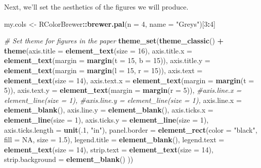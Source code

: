 \documentclass[]{article}
\newenvironment{Shaded}{\begin{snugshade}}{\end{snugshade}}
\newcommand{\KeywordTok}[1]{\textcolor[rgb]{0.13,0.29,0.53}{\textbf{#1}}}
\newcommand{\DataTypeTok}[1]{\textcolor[rgb]{0.13,0.29,0.53}{#1}}
\newcommand{\DecValTok}[1]{\textcolor[rgb]{0.00,0.00,0.81}{#1}}
\newcommand{\FloatTok}[1]{\textcolor[rgb]{0.00,0.00,0.81}{#1}}
\newcommand{\StringTok}[1]{\textcolor[rgb]{0.31,0.60,0.02}{#1}}
\newcommand{\CommentTok}[1]{\textcolor[rgb]{0.56,0.35,0.01}{\textit{#1}}}
\newcommand{\OtherTok}[1]{\textcolor[rgb]{0.56,0.35,0.01}{#1}}
\newcommand{\OperatorTok}[1]{\textcolor[rgb]{0.81,0.36,0.00}{\textbf{#1}}}
\newcommand{\NormalTok}[1]{#1}
\begin{document}
Next, we'll set the aesthetics of the figures we will produce.

\begin{Shaded}
\begin{Highlighting}[]
\NormalTok{my.cols <-}\StringTok{ }\NormalTok{RColorBrewer}\OperatorTok{::}\KeywordTok{brewer.pal}\NormalTok{(}\DataTypeTok{n =} \DecValTok{4}\NormalTok{, }\DataTypeTok{name =} \StringTok{"Greys"}\NormalTok{)[}\DecValTok{3}\OperatorTok{:}\DecValTok{4}\NormalTok{]}

\CommentTok{# Set theme for figures in the paper}
\KeywordTok{theme_set}\NormalTok{(}\KeywordTok{theme_classic}\NormalTok{() }\OperatorTok{+}\StringTok{ }
\StringTok{  }\KeywordTok{theme}\NormalTok{(}\DataTypeTok{axis.title =} \KeywordTok{element_text}\NormalTok{(}\DataTypeTok{size =} \DecValTok{16}\NormalTok{),}
        \DataTypeTok{axis.title.x =} \KeywordTok{element_text}\NormalTok{(}\DataTypeTok{margin =} \KeywordTok{margin}\NormalTok{(}\DataTypeTok{t =} \DecValTok{15}\NormalTok{, }\DataTypeTok{b =} \DecValTok{15}\NormalTok{)),}
        \DataTypeTok{axis.title.y =} \KeywordTok{element_text}\NormalTok{(}\DataTypeTok{margin =} \KeywordTok{margin}\NormalTok{(}\DataTypeTok{l =} \DecValTok{15}\NormalTok{, }\DataTypeTok{r =} \DecValTok{15}\NormalTok{)),}
        \DataTypeTok{axis.text =} \KeywordTok{element_text}\NormalTok{(}\DataTypeTok{size =} \DecValTok{14}\NormalTok{),}
        \DataTypeTok{axis.text.x =} \KeywordTok{element_text}\NormalTok{(}\DataTypeTok{margin =} \KeywordTok{margin}\NormalTok{(}\DataTypeTok{t =} \DecValTok{5}\NormalTok{)),}
        \DataTypeTok{axis.text.y =} \KeywordTok{element_text}\NormalTok{(}\DataTypeTok{margin =} \KeywordTok{margin}\NormalTok{(}\DataTypeTok{r =} \DecValTok{5}\NormalTok{)),}
        \CommentTok{#axis.line.x = element_line(size = 1),}
        \CommentTok{#axis.line.y = element_line(size = 1),}
        \DataTypeTok{axis.line.x =} \KeywordTok{element_blank}\NormalTok{(),}
        \DataTypeTok{axis.line.y =} \KeywordTok{element_blank}\NormalTok{(),}
        \DataTypeTok{axis.ticks.x =} \KeywordTok{element_line}\NormalTok{(}\DataTypeTok{size =} \DecValTok{1}\NormalTok{),}
        \DataTypeTok{axis.ticks.y =} \KeywordTok{element_line}\NormalTok{(}\DataTypeTok{size =} \DecValTok{1}\NormalTok{),}
        \DataTypeTok{axis.ticks.length =} \KeywordTok{unit}\NormalTok{(.}\DecValTok{1}\NormalTok{, }\StringTok{"in"}\NormalTok{),}
        \DataTypeTok{panel.border =} \KeywordTok{element_rect}\NormalTok{(}\DataTypeTok{color =} \StringTok{"black"}\NormalTok{, }\DataTypeTok{fill =} \OtherTok{NA}\NormalTok{, }\DataTypeTok{size =} \FloatTok{1.5}\NormalTok{),}
        \DataTypeTok{legend.title =} \KeywordTok{element_blank}\NormalTok{(),}
        \DataTypeTok{legend.text =} \KeywordTok{element_text}\NormalTok{(}\DataTypeTok{size =} \DecValTok{14}\NormalTok{),}
        \DataTypeTok{strip.text =} \KeywordTok{element_text}\NormalTok{(}\DataTypeTok{size =} \DecValTok{14}\NormalTok{),}
        \DataTypeTok{strip.background =} \KeywordTok{element_blank}\NormalTok{()}
\NormalTok{        ))}
\end{Highlighting}
\end{Shaded}
\end{document}
